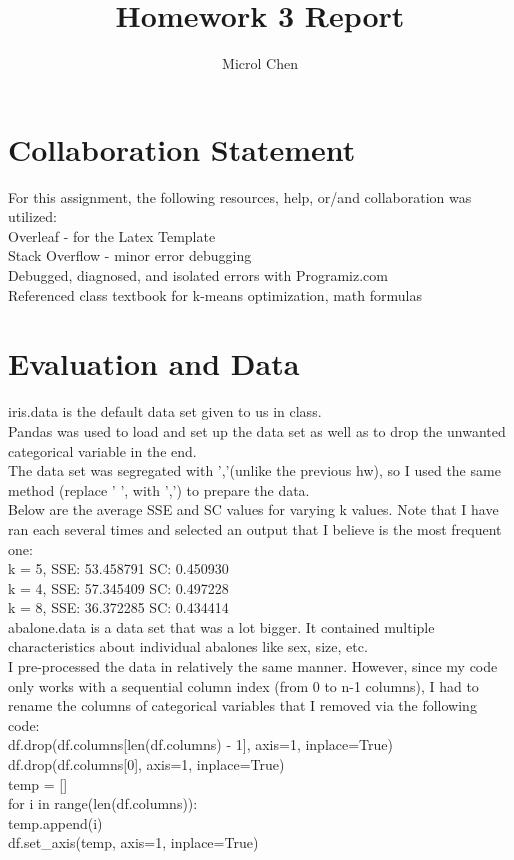 \documentclass{article}
\title{Homework 3 Report}
\author{Microl Chen}
\begin{document}
\maketitle

\section{Collaboration Statement}
For this assignment, the following resources, help, or/and collaboration was utilized:
\\Overleaf - for the Latex Template
\\Stack Overflow - minor error debugging
\\Debugged, diagnosed, and isolated errors with Programiz.com
\\Referenced class textbook for k-means optimization, math formulas


\section{Evaluation and Data}
iris.data is the default data set given to us in class.\\
Pandas was used to load and set up the data set as well as to drop the unwanted categorical variable in the end. \\
The data set was segregated with ','(unlike the previous hw), so I used the same method (replace ' ', with ',') to prepare the data. \\

\noindent
Below are the average SSE and SC values for varying k values. Note that I have ran each several times and selected an output that I believe is the most frequent one:\\
\noindent
k = 5, SSE: 53.458791 	 SC: 0.450930 \\
k = 4, SSE: 57.345409 	 SC: 0.497228 \\
k = 8, SSE: 36.372285 	 SC: 0.434414 \\

\noindent
abalone.data is a data set that was a lot bigger. It contained multiple characteristics about individual abalones like sex, size, etc. \\
I pre-processed the data in relatively the same manner. However, since my code only works with a sequential column index (from 0 to n-1 columns), I had to rename the columns of categorical variables that I removed via the following code:\\
\noindent
df.drop(df.columns[len(df.columns) - 1], axis=1, inplace=True)\\ 
\indent
df.drop(df.columns[0], axis=1, inplace=True)\\\indent
temp = []\\\indent
for i in range(len(df.columns)):\\\indent\indent
    temp.append(i)\\\indent
df.set\_axis(temp, axis=1, inplace=True)\\
\end{document}
